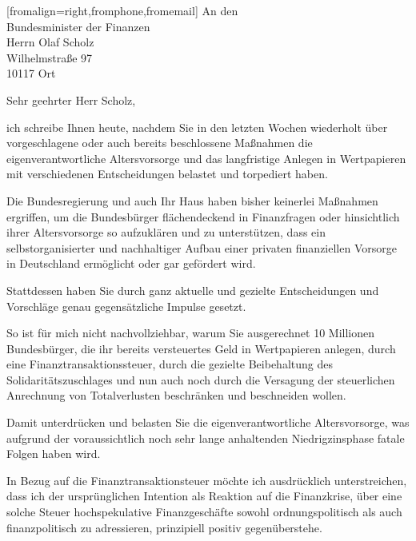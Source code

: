 \documentclass[ version=last,
                backaddress=on,
                12pt,
                a4paper,
                firstfoot=false,
                fromrule=false,
                fromlogo=false,
                enlargefirstpage=true]{scrlttr2}
\begin{document}
\pagestyle{headings}

\setlength{\tabcolsep}{12pt}


\begin{letter}[fromalign=right,fromphone,fromemail]{
An den\\
Bundesminister der Finanzen\\
Herrn Olaf Scholz\\
Wilhelmstraße 97\\
10117 Ort
}

\opening{Sehr geehrter Herr Scholz,}


ich schreibe Ihnen heute, nachdem Sie in den letzten Wochen wiederholt über
    vorgeschlagene oder auch bereits beschlossene Maßnahmen die
    eigenverantwortliche Altersvorsorge und das langfristige Anlegen in
    Wertpapieren mit verschiedenen Entscheidungen belastet und torpediert
    haben.

Die Bundesregierung und auch Ihr Haus haben bisher keinerlei Maßnahmen
    ergriffen, um die Bundesbürger flächendeckend in Finanzfragen oder
    hinsichtlich ihrer Altersvorsorge so aufzuklären und zu unterstützen, dass
    ein selbstorganisierter und nachhaltiger Aufbau einer privaten finanziellen
    Vorsorge in Deutschland ermöglicht oder gar gefördert wird.

Stattdessen haben Sie durch ganz aktuelle und gezielte Entscheidungen und
    Vorschläge genau gegensätzliche Impulse gesetzt.

So ist für mich nicht nachvollziehbar, warum Sie ausgerechnet 10 Millionen
    Bundesbürger, die ihr bereits versteuertes Geld in Wertpapieren anlegen,
    durch eine Finanztransaktionssteuer, durch die gezielte Beibehaltung des
    Solidaritätszuschlages und nun auch noch durch die Versagung der
    steuerlichen Anrechnung von Totalverlusten beschränken und beschneiden
    wollen.

Damit unterdrücken und belasten Sie die eigenverantwortliche Altersvorsorge,
    was aufgrund der voraussichtlich noch sehr lange anhaltenden
    Niedrigzinsphase fatale Folgen haben wird.

In Bezug auf die Finanztransaktionsteuer möchte ich ausdrücklich
    unterstreichen, dass ich der ursprünglichen Intention als Reaktion auf die
    Finanzkrise, über eine solche Steuer hochspekulative Finanzgeschäfte sowohl
    ordnungspolitisch als auch finanzpolitisch zu adressieren, prinzipiell
    positiv gegenüberstehe. 


\end{letter}
\end{document}
